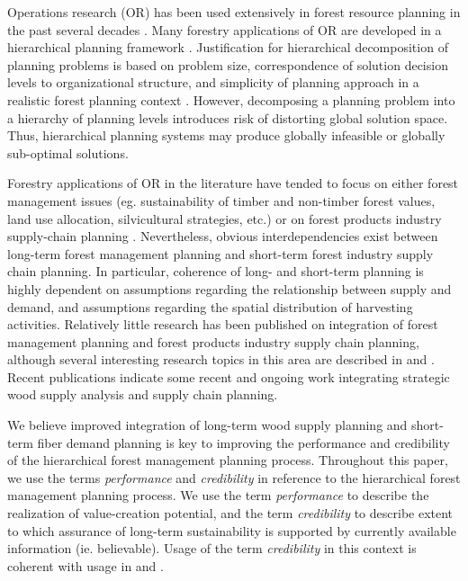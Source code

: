 Operations research (OR) has been used extensively in forest resource
planning in the past several decades \citep{weintraub2006operations}.
Many forestry applications of OR are developed in a hierarchical
planning framework \citep{weintraub1991hierarchical,
  weintraub2007handbook}. Justification for hierarchical decomposition
of planning problems is based on problem size, correspondence of
solution decision levels to organizational structure, and simplicity
of planning approach in a realistic forest planning context
\citep{weintraub1991hierarchical}.  However, decomposing a planning
problem into a hierarchy of planning levels introduces risk of
distorting global solution space.  Thus, hierarchical planning systems
may produce globally infeasible or globally sub-optimal solutions.

Forestry applications of OR in the literature have
tended to focus on either forest management issues (eg. sustainability
of timber and non-timber forest values, land use allocation,
silvicultural strategies, etc.)
\citep{bettinger2004key,gunn2007models} or on forest products industry
supply-chain planning \citep{damours2008using,carlsson2006supply}.
Nevertheless, obvious interdependencies exist between long-term forest
management planning and short-term forest industry supply chain
planning.  In particular, coherence of long- and short-term
planning is highly dependent on assumptions regarding the relationship
between supply and demand, and assumptions regarding the spatial
distribution of harvesting activities. Relatively little research has been
published on integration of forest management planning and forest
products industry supply chain planning, although several interesting
research topics in this area are described in \citet{nelson2003forest}
and \citet{weintraub2006review}.  Recent publications
\citep{troncoso2011mixed,gunn2009some} indicate some recent and
ongoing work integrating strategic wood supply analysis and supply
chain planning. 

We believe improved integration of long-term wood supply planning and
short-term fiber demand planning is key to improving the
performance and credibility of the hierarchical forest management
planning process. Throughout this paper, we use the terms
\emph{performance} and \emph{credibility} in reference to the
hierarchical forest management planning process. We use the term
\emph{performance} to describe the realization of value-creation
potential, and the term \emph{credibility} to describe extent to which
assurance of long-term sustainability is supported by currently
available information (ie. believable). Usage of the term
\emph{credibility} in this context is coherent with usage in
\citet{daugherty1991credibility} and \citet{davis2001forest-ch13}.

